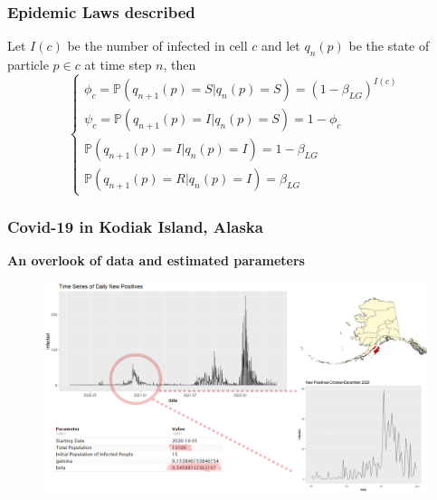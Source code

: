 \documentclass[usenames,dvipsnames]{beamer}
\newcommand{\deftitle}[1]{\color{darkred}\bf{#1}\color{black}}
\newcommand{\dftitle}[2]{\color{#2}\bf{#1}\color{black}}
\newcommand{\p}{\mathbb{P}}
\begin{document}
\begin{frame}
\frametitle{Epidemic Laws described}
\centering
\begin{theorem}
Let $I(c)$ be the number of infected in cell $c$ and let $q_n(p)$ be the state of particle $p \in c$ at time step $n$, then
\[
\begin{cases}
	 \phi_c=\p\left(q_{n+1}(p)=S |q_{n}(p)=S\right)=(1-\beta_{LG})^{I(c)} \\
     \psi_c=\p\left(q_{n+1}(p)=I |q_{n}(p)=S\right)=1-\phi_c\\
     \p\left(q_{n+1}(p)=I |q_{n}(p)=I\right)=1-\beta_{LG} \\
     \p\left(q_{n+1}(p)=R |q_{n}(p)=I\right)=\beta_{LG}
\end{cases}
\]
\end{theorem}
\end{frame}


\begin{frame}
	\frametitle{Covid-19 in Kodiak Island, Alaska}
\begin{center}
	\dftitle{An overlook of data and estimated parameters}{Bittersweet}
\end{center}
	\begin{figure}
		\includegraphics[width=0.93\linewidth]{covid_glob.png}
	\end{figure}

\end{frame}
\end{document}
